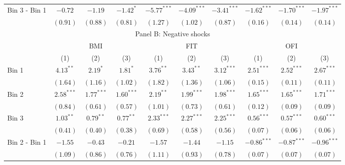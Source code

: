 \begin{tabular}{lccccccccc}
  Bin 3 - Bin 1 & $-0.72$ & $-1.19$ & $-1.42^{*}$ & $-5.77^{***}$ & $-4.09^{***}$ & $-3.41^{***}$ & $-1.62^{***}$ & $-1.70^{***}$ & $-1.97^{***}$ \\

   & $(0.91)$ & $(0.88)$ & $(0.81)$ & $(1.27)$ & $(1.02)$ & $(0.87)$ & $(0.16)$ & $(0.14)$ & $(0.14)$ \\

  \hline \multicolumn{10}{c}{Panel B: Negative shocks} \\

  \hline

  & \multicolumn{3}{c}{BMI} & \multicolumn{3}{c}{FIT} & \multicolumn{3}{c}{OFI} \\

  \cmidrule(lr){2-4} \cmidrule(lr){5-7} \cmidrule(lr){8-10}

  & (1) & (2) & (3) & (1) & (2) & (3) & (1) & (2) & (3) \\

  Bin 1 & $4.13^{**}$ & $2.19^{*}$ & $1.81^{*}$ & $3.76^{**}$ & $3.43^{**}$ & $3.12^{***}$ & $2.51^{***}$ & $2.52^{***}$ & $2.67^{***}$ \\

   & $(1.64)$ & $(1.16)$ & $(1.02)$ & $(1.82)$ & $(1.36)$ & $(1.06)$ & $(0.15)$ & $(0.11)$ & $(0.11)$ \\

  Bin 2 & $2.58^{***}$ & $1.77^{***}$ & $1.60^{***}$ & $2.19^{**}$ & $1.99^{***}$ & $1.98^{***}$ & $1.65^{***}$ & $1.65^{***}$ & $1.71^{***}$ \\

   & $(0.84)$ & $(0.61)$ & $(0.57)$ & $(1.01)$ & $(0.73)$ & $(0.61)$ & $(0.12)$ & $(0.09)$ & $(0.09)$ \\

  Bin 3 & $1.03^{**}$ & $0.79^{**}$ & $0.77^{**}$ & $2.33^{***}$ & $2.27^{***}$ & $2.25^{***}$ & $0.56^{***}$ & $0.57^{***}$ & $0.60^{***}$ \\

   & $(0.41)$ & $(0.40)$ & $(0.38)$ & $(0.69)$ & $(0.58)$ & $(0.56)$ & $(0.07)$ & $(0.06)$ & $(0.06)$ \\

  Bin 2 - Bin 1 & $-1.55$ & $-0.43$ & $-0.21$ & $-1.57$ & $-1.44$ & $-1.15$ & $-0.86^{***}$ & $-0.87^{***}$ & $-0.96^{***}$ \\

   & $(1.09)$ & $(0.86)$ & $(0.76)$ & $(1.11)$ & $(0.93)$ & $(0.78)$ & $(0.07)$ & $(0.07)$ & $(0.07)$ \\


\end{tabular}
